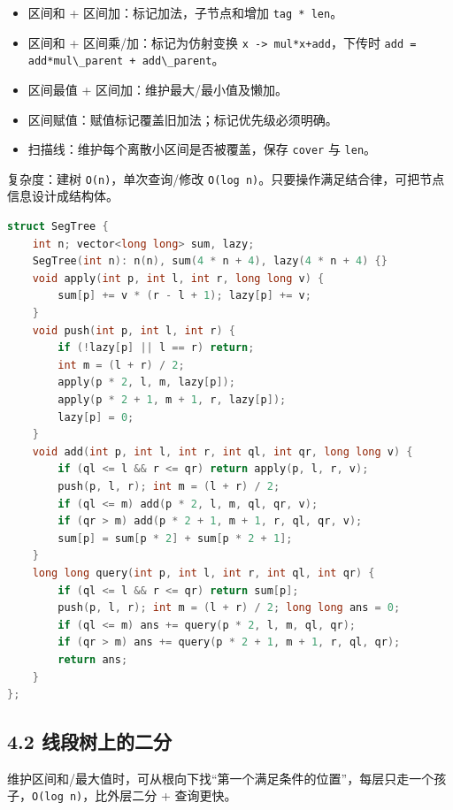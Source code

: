 \begin{itemize}
\tightlist
\item
  区间和 + 区间加：标记加法，子节点和增加 \passthrough{\lstinline!tag * len!}。
\item
  区间和 + 区间乘/加：标记为仿射变换 \passthrough{\lstinline!x -> mul*x+add!}，下传时 \passthrough{\lstinline!add = add*mul\_parent + add\_parent!}。
\item
  区间最值 + 区间加：维护最大/最小值及懒加。
\item
  区间赋值：赋值标记覆盖旧加法；标记优先级必须明确。
\item
  扫描线：维护每个离散小区间是否被覆盖，保存 \passthrough{\lstinline!cover!} 与 \passthrough{\lstinline!len!}。
\end{itemize}

复杂度：建树 \passthrough{\lstinline!O(n)!}，单次查询/修改 \passthrough{\lstinline!O(log n)!}。只要操作满足结合律，可把节点信息设计成结构体。

\begin{lstlisting}[language={C++}]
struct SegTree {
    int n; vector<long long> sum, lazy;
    SegTree(int n): n(n), sum(4 * n + 4), lazy(4 * n + 4) {}
    void apply(int p, int l, int r, long long v) {
        sum[p] += v * (r - l + 1); lazy[p] += v;
    }
    void push(int p, int l, int r) {
        if (!lazy[p] || l == r) return;
        int m = (l + r) / 2;
        apply(p * 2, l, m, lazy[p]);
        apply(p * 2 + 1, m + 1, r, lazy[p]);
        lazy[p] = 0;
    }
    void add(int p, int l, int r, int ql, int qr, long long v) {
        if (ql <= l && r <= qr) return apply(p, l, r, v);
        push(p, l, r); int m = (l + r) / 2;
        if (ql <= m) add(p * 2, l, m, ql, qr, v);
        if (qr > m) add(p * 2 + 1, m + 1, r, ql, qr, v);
        sum[p] = sum[p * 2] + sum[p * 2 + 1];
    }
    long long query(int p, int l, int r, int ql, int qr) {
        if (ql <= l && r <= qr) return sum[p];
        push(p, l, r); int m = (l + r) / 2; long long ans = 0;
        if (ql <= m) ans += query(p * 2, l, m, ql, qr);
        if (qr > m) ans += query(p * 2 + 1, m + 1, r, ql, qr);
        return ans;
    }
};
\end{lstlisting}

\subsection{4.2 线段树上的二分}\label{ux7ebfux6bb5ux6811ux4e0aux7684ux4e8cux5206}

维护区间和/最大值时，可从根向下找``第一个满足条件的位置''，每层只走一个孩子，\passthrough{\lstinline!O(log n)!}，比外层二分 + 查询更快。

